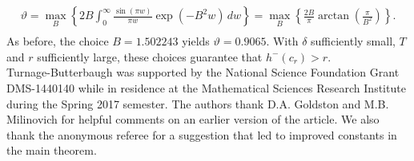 \documentclass[oneside]{amsart}
\begin{document}
\begin{equation*}\begin{split}
\vartheta = \max_{B}\left\{2B\int_{0}^{\infty}\frac{\sin(\pi w)}{\pi w}\exp\left(-B^2w\right)\,dw\right\}= \max_{B}\left\{\frac{2B}{\pi}\arctan\left(\frac{\pi}{B^2} \right)\right\}.  \\
\end{split}\end{equation*}
As before, the choice $B=1.502243$ yields $\vartheta = 0.9065$. With $\delta$ sufficiently small, $T$ and $r$ sufficiently large, these choices guarantee that $h^-(c_r) > r$. \\












 Turnage-Butterbaugh was supported by the National Science Foundation Grant DMS-1440140 while in residence at the Mathematical Sciences Research Institute during the Spring 2017 semester. The authors thank D.A. Goldston and M.B. Milinovich for helpful comments on an earlier version of the article. We also thank the anonymous referee for a suggestion that led to improved constants in the main theorem.
\end{document}
